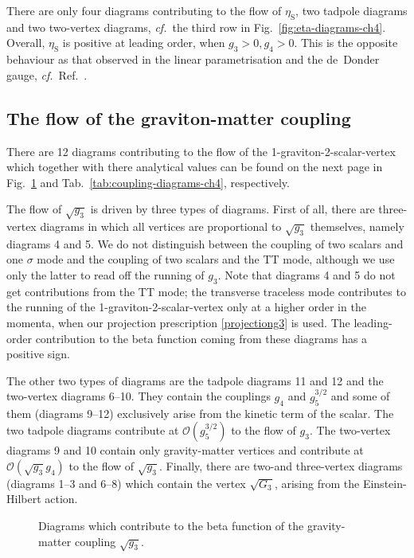 \documentclass[11pt]{book}
\newcommand\etaS{ \eta_{\scriptscriptstyle{\mathrm{S}}} }
\newcommand\cf{\textit{cf.}\ }
\numberwithin{equation}{chapter}
\begin{document}
There are only four diagrams contributing to the flow of $\etaS$, two tadpole diagrams and two two-vertex diagrams,
\cf the third row in Fig.~\ref{fig:eta-diagrams-ch4}.
Overall, $\etaS$ is positive at leading order, when $g_3>0, g_4>0$.
This is the opposite behaviour as that observed in the linear parametrisation
and the de~Donder gauge, \cf Ref.~\cite{Dona:2013qba}.


\subsection{The flow of the graviton-matter coupling}

There are 12 diagrams contributing to the
flow of the 1-graviton-2-scalar-vertex
which together with there analytical values can be found on
the next page
in Fig.~\ref{fig:coupling-diagrams-ch4} and Tab.~\ref{tab:coupling-diagrams-ch4},
respectively.


The flow of $\sqrt{g_3}$ is driven by three types of diagrams.
First of all, there are three-vertex diagrams in which all
vertices are proportional to $\sqrt{g_3}$ themselves,
namely diagrams 4 and 5.
We do not distinguish between the coupling of two
scalars and one $\sigma$ mode and the coupling of two scalars and
the $\mathrm{TT}$ mode,
although we use only the latter to read off the running of $g_3$.
Note that diagrams 4 and 5 do not get contributions from the $\mathrm{TT}$ mode;
the transverse traceless mode contributes to the running of the
1-graviton-2-scalar-vertex only at a higher order in the momenta,
when our projection prescription \eqref{projectiong3} is used.
The leading-order contribution to the beta function coming from
these diagrams has a positive sign.

The other two types of diagrams are the tadpole diagrams 11 and 12
and the two-vertex diagrams 6--10.
They contain the couplings $g_4$ and $g_5^{3/2}$ and
some of them (diagrams 9--12) exclusively arise from the kinetic term of the scalar.
The two tadpole diagrams contribute at $\mathcal{O}(g_5^{3/2})$ to the flow of $g_3$.
The two-vertex diagrams 9 and 10 contain only gravity-matter vertices and contribute
at $\mathcal{O}(\sqrt{g_3} g_4)$ to the flow of $\sqrt{g_3}$.
Finally, there are two-and three-vertex diagrams (diagrams 1--3 and 6--8)
which contain the vertex $\sqrt{G_3}$, arising from the Einstein-Hilbert action.

\begin{figure}[p]
  \begin{center}
    
  \end{center}
  \caption{
    Diagrams which contribute to the beta function of the gravity-matter coupling
    $\sqrt{g_3}$.
  }
  \label{fig:coupling-diagrams-ch4}
\end{figure}
\end{document}
